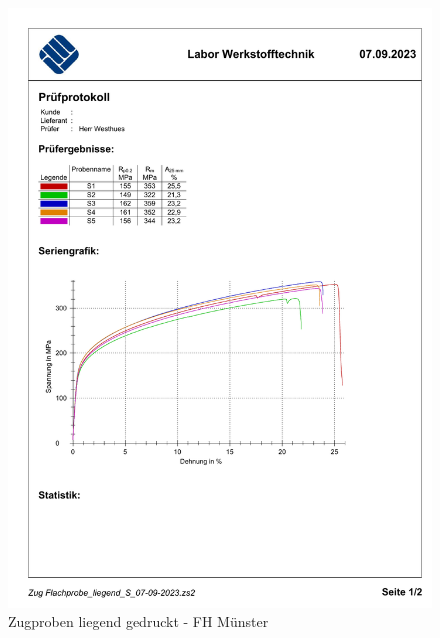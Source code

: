   \begin{figure}[ht]
    \centering
    \includegraphics[width=1\textwidth]{bilder/Zug Flachprobe_liegend_S.pdf}
    \caption{Zugproben liegend gedruckt - FH Münster}
    \label{ZugprobenS}
  \end{figure}
  
